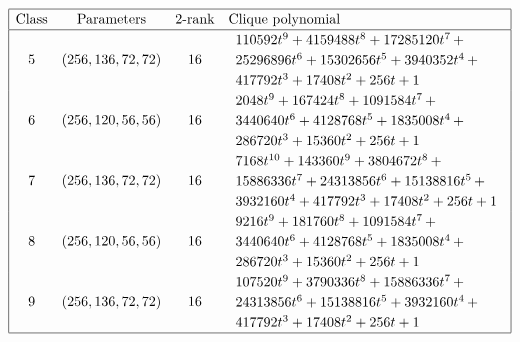 \documentclass[12pt,a4paper]{article}
\begin{document}
\begin{table}[!bhpt] %
\small{}
\begin{align*}
\def\arraystretch{1.2}
\begin{array}{|cccl|}
\hline
\text{Class} &
\text{Parameters} &
\text{2-rank} &
\text{Clique polynomial}
\\
\hline
5 &
(256, 136, 72, 72) &
16 &
\begin{array}{l}
110592t^{9} + 4159488t^{8} + 17285120t^{7}
\,+
\\
 25296896t^{6} + 15302656t^{5} + 3940352t^{4}
\,+
\\
 417792t^{3} + 17408t^{2} + 256t + 1
\end{array}
\\
6 &
(256, 120, 56, 56) &
16 &
\begin{array}{l}
2048t^{9} + 167424t^{8} + 1091584t^{7}
\,+
\\
 3440640t^{6} + 4128768t^{5} + 1835008t^{4}
\,+
\\
 286720t^{3} + 15360t^{2} + 256t + 1
\end{array}
\\
7 &
(256, 136, 72, 72) &
16 &
\begin{array}{l}
7168t^{10} + 143360t^{9} + 3804672t^{8}
\,+
\\
 15886336t^{7} + 24313856t^{6} + 15138816t^{5}
\,+
\\
 3932160t^{4} + 417792t^{3} + 17408t^{2} + 256t + 1
\end{array}
\\
8 &
(256, 120, 56, 56) &
16 &
\begin{array}{l}
9216t^{9} + 181760t^{8} + 1091584t^{7}
\,+
\\
 3440640t^{6} + 4128768t^{5} + 1835008t^{4}
\,+
\\
 286720t^{3} + 15360t^{2} + 256t + 1
\end{array}
\\
9 &
(256, 136, 72, 72) &
16 &
\begin{array}{l}
107520t^{9} + 3790336t^{8} + 15886336t^{7}
\,+
\\
 24313856t^{6} + 15138816t^{5} + 3932160t^{4}
\,+
\\
 417792t^{3} + 17408t^{2} + 256t + 1
\end{array}
\\
\hline
\end{array}
\end{align*}
\caption{$[f_{8,10}]$ extended Cayley classes (part 2).}
\label{tab-c8_10_EC_classes_2}
\end{table}
\end{document}
